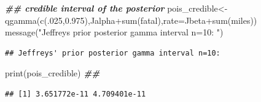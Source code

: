 \documentclass[
]{book}
\newenvironment{Shaded}{\begin{snugshade}}{\end{snugshade}}
\newcommand{\AttributeTok}[1]{\textcolor[rgb]{0.77,0.63,0.00}{#1}}
\newcommand{\DecValTok}[1]{\textcolor[rgb]{0.00,0.00,0.81}{#1}}
\newcommand{\DocumentationTok}[1]{\textcolor[rgb]{0.56,0.35,0.01}{\textbf{\textit{#1}}}}
\newcommand{\FloatTok}[1]{\textcolor[rgb]{0.00,0.00,0.81}{#1}}
\newcommand{\FunctionTok}[1]{\textcolor[rgb]{0.00,0.00,0.00}{#1}}
\newcommand{\NormalTok}[1]{#1}
\newcommand{\OtherTok}[1]{\textcolor[rgb]{0.56,0.35,0.01}{#1}}
\newcommand{\SpecialCharTok}[1]{\textcolor[rgb]{0.00,0.00,0.00}{#1}}
\newcommand{\StringTok}[1]{\textcolor[rgb]{0.31,0.60,0.02}{#1}}
\theoremstyle{definition}
\theoremstyle{definition}
\theoremstyle{definition}
\theoremstyle{definition}
\theoremstyle{remark}
\begin{document}
\begin{Shaded}
\begin{Highlighting}[]
 \DocumentationTok{\#\# credible interval of the posterior}
\NormalTok{ pois\_credible}\OtherTok{\textless{}{-}}\FunctionTok{qgamma}\NormalTok{(}\FunctionTok{c}\NormalTok{(.}\DecValTok{025}\NormalTok{,}\FloatTok{0.975}\NormalTok{),Jalpha}\SpecialCharTok{+}\FunctionTok{sum}\NormalTok{(fatal),}\AttributeTok{rate=}\NormalTok{Jbeta}\SpecialCharTok{+}\FunctionTok{sum}\NormalTok{(miles))}
 \FunctionTok{message}\NormalTok{(}\StringTok{"Jeffreys\textquotesingle{} prior posterior gamma interval n=10: "}\NormalTok{)}
\end{Highlighting}
\end{Shaded}

\begin{verbatim}
## Jeffreys' prior posterior gamma interval n=10:
\end{verbatim}

\begin{Shaded}
\begin{Highlighting}[]
 \FunctionTok{print}\NormalTok{(pois\_credible) }\DocumentationTok{\#\# }
\end{Highlighting}
\end{Shaded}

\begin{verbatim}
## [1] 3.651772e-11 4.709401e-11
\end{verbatim}
\end{document}
